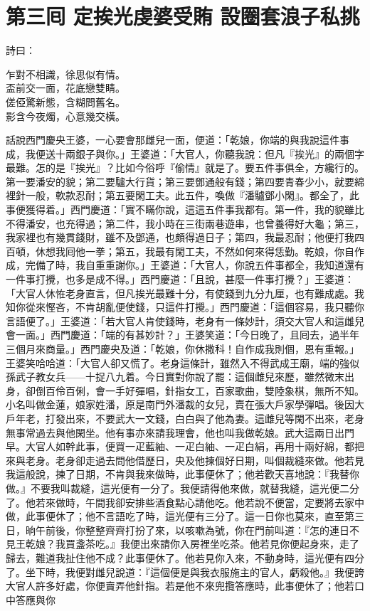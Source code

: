 
\chapter*{第三囘 定挨光虔婆受賄 設圈套浪子私挑}


詩曰：

\begin{myquote} 
乍對不相識，徐思似有情。\\盃前交一面，花底戀雙睛。\\傞俹驚新態，含糊問舊名。\\影含今夜燭，心意幾交橫。
\end{myquote} 

話說西門慶央王婆，一心要會那雌兒一面，便道：「乾娘，你端的與我說這件事成，我便送十兩銀子與你。」王婆道：「大官人，你聽我說：但凡『挨光』的兩個字最難。怎的是『挨光』？比如今俗呼『偷情』就是了。要五件事俱全，方纔行的。第一要潘安的貌；第二要驢大行貨；第三要鄧通般有錢；第四要青春少小，就要綿裡針一般，軟款忍耐；第五要閑工夫。此五件，喚做『潘驢鄧小閑』。都全了，此事便獲得着。」西門慶道：「實不瞞你說，這這五件事我都有。第一件，我的貌雖比不得潘安，也充得過；第二件，我小時在三街兩巷遊串，也曾養得好大龜；第三，我家裡也有幾貫錢財，雖不及鄧通，也頗得過日子；第四，我最忍耐；他便打我四百頓，休想我囘他一拳；第五，我最有閑工夫，不然如何來得恁勤。乾娘，你自作成，完備了時，我自重重謝你。」王婆道：「大官人，你說五件事都全，我知道還有一件事打攪，也多是成不得。」西門慶道：「且說，甚麼一件事打攪？」王婆道：「大官人休恠老身直言，但凡挨光最難十分，有使錢到九分九厘，也有難成處。我知你從來慳吝，不肯胡亂便使錢，只這件打攪。」西門慶道：「這個容易，我只聽你言語便了。」王婆道：「若大官人肯使錢時，老身有一條妙計，須交大官人和這雌兒會一面。」西門慶道：「端的有甚妙計？」王婆笑道：「今日晚了，且囘去，過半年三個月來商量。」西門慶央及道：「乾娘，你休撒科！自作成我則個，恩有重報。」王婆笑哈哈道：「大官人卻又慌了。老身這條計，雖然入不得武成王廟，端的強似孫武子教女兵——十捉八九着。今日實對你說了罷：這個雌兒來歷，雖然微末出身，卻倒百伶百俐，會一手好彈唱，針指女工，百家歌曲，雙陸象棋，無所不知。小名叫做金蓮，娘家姓潘，原是南門外潘裁的女兒，賣在張大戶家學彈唱。後因大戶年老，打發出來，不要武大一文錢，白白與了他為妻。這雌兒等閑不出來，老身無事常過去與他閑坐。他有事亦來請我理會，他也叫我做乾娘。武大這兩日出門早。大官人如幹此事，便買一疋藍紬、一疋白紬、一疋白絹，再用十兩好綿，都把來與老身。老身卻走過去問他借歷日，央及他揀個好日期，叫個裁縫來做。他若見我這般說，揀了日期，不肯與我來做時，此事便休了；他若歡天喜地說：『我替你做。』不要我叫裁縫，這光便有一分了。{}我便請得他來做，就替我縫，這光便二分了。他若來做時，午間我卻安排些酒食點心請他吃。他若說不便當，定要將去家中做，此事便休了；他不言語吃了時，這光便有三分了。這一日你也莫來，直至第三日，晌午前後，你整整齊齊打扮了來，以咳嗽為號，你在門前叫道：『怎的連日不見王乾娘？我買盞茶吃。』我便出來請你入房裡坐吃茶。他若見你便起身來，走了歸去，難道我扯住他不成？此事便休了。他若見你入來，不動身時，這光便有四分了。坐下時，我便對雌兒說道：『這個便是與我衣服施主的官人，虧殺他。』我便誇大官人許多好處，你便賣弄他針指。若是他不來兜攬答應時，此事便休了；他若口中答應與你